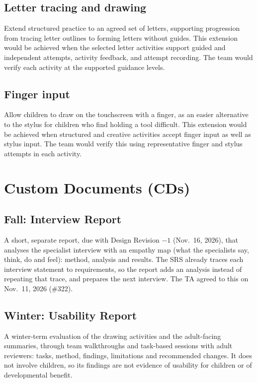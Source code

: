 \documentclass{article}
\begin{document}
\subsection{Letter tracing and drawing}
Extend structured practice to an agreed set of letters, supporting
progression from tracing letter outlines to forming letters without
guides. This extension would be achieved when the selected letter
activities support guided and independent attempts, activity feedback,
and attempt recording. The team would verify each activity at the
supported guidance levels.

\subsection{Finger input}
Allow children to draw on the touchscreen with a finger, as an easier
alternative to the stylus for children who find holding a tool
difficult. This extension would be achieved when structured and creative
activities accept finger input as well as stylus input. The team would
verify this using representative finger and stylus attempts in each
activity.

\section{Custom Documents (CDs)}
\renewcommand{\thesubsection}{CD.\arabic{subsection}}

\subsection{Fall: Interview Report}

A short, separate report, due with Design Revision $-1$ (Nov.~16, 2026), that
analyses the specialist interview with an empathy map (what the specialists
say, think, do and feel): method, analysis and results. The SRS already traces
each interview statement to requirements, so the report adds an analysis
instead of repeating that trace, and prepares the next interview. The TA agreed
to this on Nov.~11, 2026 (\#322).

\subsection{Winter: Usability Report}

A winter-term evaluation of the drawing activities and the adult-facing
summaries, through team walkthroughs and task-based sessions with adult
reviewers: tasks, method, findings, limitations and recommended changes. It
does not involve children, so its findings are not evidence of usability for
children or of developmental benefit.
\end{document}
